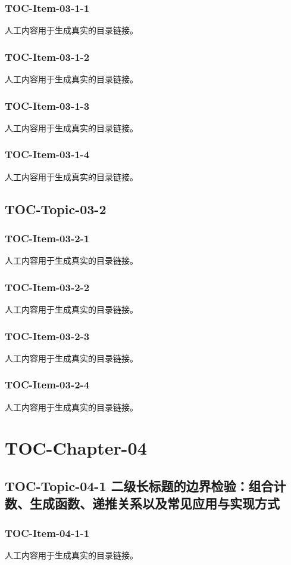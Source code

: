\subsubsection{TOC-Item-03-1-1}
人工内容用于生成真实的目录链接。
\subsubsection{TOC-Item-03-1-2}
人工内容用于生成真实的目录链接。
\subsubsection{TOC-Item-03-1-3}
人工内容用于生成真实的目录链接。
\subsubsection{TOC-Item-03-1-4}
人工内容用于生成真实的目录链接。
\subsection{TOC-Topic-03-2}
\subsubsection{TOC-Item-03-2-1}
人工内容用于生成真实的目录链接。
\subsubsection{TOC-Item-03-2-2}
人工内容用于生成真实的目录链接。
\subsubsection{TOC-Item-03-2-3}
人工内容用于生成真实的目录链接。
\subsubsection{TOC-Item-03-2-4}
人工内容用于生成真实的目录链接。
\section{TOC-Chapter-04}
\subsection{TOC-Topic-04-1 二级长标题的边界检验：组合计数、生成函数、递推关系以及常见应用与实现方式}
\subsubsection{TOC-Item-04-1-1}
人工内容用于生成真实的目录链接。
